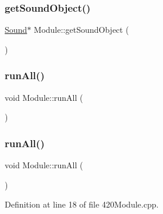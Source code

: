 \subsubsection{\texorpdfstring{get\+Sound\+Object()}{getSoundObject()}\hspace{0.1cm}{\footnotesize\ttfamily [2/2]}}
{\footnotesize\ttfamily \hyperlink{class_sound}{Sound}$\ast$ Module\+::get\+Sound\+Object (\begin{DoxyParamCaption}{ }\end{DoxyParamCaption})}

\mbox{\label{class_module_a7ed8e04ba630f6734ac15d06c4eae999}} 
\subsubsection{\texorpdfstring{run\+All()}{runAll()}\hspace{0.1cm}{\footnotesize\ttfamily [1/2]}}
{\footnotesize\ttfamily void Module\+::run\+All (\begin{DoxyParamCaption}{ }\end{DoxyParamCaption})}

\mbox{\label{class_module_a7ed8e04ba630f6734ac15d06c4eae999}} 
\subsubsection{\texorpdfstring{run\+All()}{runAll()}\hspace{0.1cm}{\footnotesize\ttfamily [2/2]}}
{\footnotesize\ttfamily void Module\+::run\+All (\begin{DoxyParamCaption}{ }\end{DoxyParamCaption})}



Definition at line 18 of file 420\+Module.\+cpp.

